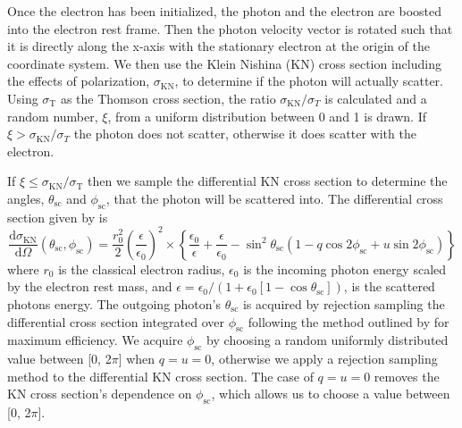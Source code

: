 \documentclass[12pt,a4paper]{article}
\begin{document}
Once the electron has been initialized, the photon and the electron are boosted into the electron rest frame. Then the photon velocity vector is rotated such that it is directly along the x-axis with the stationary electron at the origin of the coordinate system. We then use the Klein Nishina (KN) cross section including the effects of polarization, $\sigma_\mathrm{KN}$, to determine if the photon will actually scatter.  Using $\sigma_{\mathrm{T}}$ as the Thomson cross section, the ratio $\sigma_\mathrm{KN}/\sigma_T$ is calculated and a random number, $\xi$, from a uniform distribution between 0 and 1 is drawn. If $\xi >\sigma_\mathrm{KN}/\sigma_T $ the photon does not scatter, otherwise it does scatter with the electron. 

If $\xi \le \sigma_{\mathrm{KN}}/\sigma_{\mathrm{T}}$ then we sample the differential KN cross section to determine the angles, $\theta_{\mathrm{sc}}$ and $\phi_{\mathrm{sc}}$, that the photon will be scattered into. The differential cross section given by \cite{lundman2014polarization} is
\begin{equation}
\frac{\mathrm{d} \sigma_{\mathrm{KN}}}{\mathrm{d} \Omega} (\theta_{\mathrm{sc}}, \phi_{\mathrm{sc}}) =\frac{r_{0}^{2}}{2}\left(\frac{\epsilon}{\epsilon_{0}}\right)^{2} \times 
\left\{\frac{\epsilon_{0}}{\epsilon}+\frac{\epsilon}{\epsilon_{0}} - \sin ^{2} \theta_{\mathrm{sc}}\left(1- q \cos 2 \phi_{\mathrm{sc}}+u \sin 2 \phi_{\mathrm{sc}}\right)\right\} \label{KN_diff_cross_section_scatt}
\end{equation}
where $r_{0}$ is the classical electron radius, $\epsilon_{0}$ is the incoming photon energy scaled by the electron rest mass, and $\epsilon=\epsilon_{0}/(1+\epsilon_{0}[1-\cos \theta_{\mathrm{sc}}])$, is the scattered photons energy. The outgoing photon's $\theta_{\mathrm{sc}}$ is acquired by rejection sampling the differential cross section integrated over $\phi_{\mathrm{sc}}$ following the method outlined by \cite{sample_kn_theta} for maximum efficiency. We acquire $\phi_{\mathrm{sc}}$ by choosing a random uniformly distributed value between [0, 2$\pi$] when $q=u=0$, otherwise we apply a rejection sampling method to the differential KN cross section. {The case of $q=u=0$ removes the KN cross section's  dependence on $\phi_{\mathrm{sc}}$, which allows us to choose a value between [0, 2$\pi$].}
\end{document}

